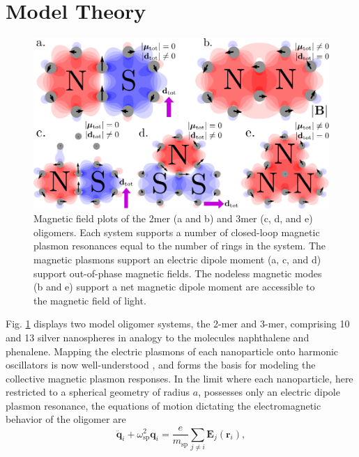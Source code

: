 \documentclass[journal=apchd5,manuscript=article]{achemso}
\begin{document}
\section{Model Theory}
\begin{figure}
\includegraphics{fig1.pdf}
\caption{Magnetic field plots of the 2mer (a and b) and 3mer (c, d, and e) oligomers. Each system supports a number of closed-loop magnetic plasmon resonances equal to the number of rings in the system. The magnetic plasmons support an electric dipole moment (a, c, and d) support out-of-phase magnetic fields. The nodeless magnetic modes (b and e) support a net magnetic dipole moment are accessible to the magnetic field of light.}
\label{field_plots}
\end{figure}
Fig. \ref{field_plots} displays two model oligomer systems, the 2-mer and 3-mer, comprising 10 and 13 silver nanospheres in analogy to the molecules naphthalene and phenalene. Mapping the electric plasmons of each nanoparticle onto harmonic oscillators is now well-understood \cite{Cherqui2014,ARPC}, and forms the basis for modeling the collective magnetic plasmon responses. In the limit where each nanoparticle, here restricted to a spherical geometry of radius $a$, possesses only an electric dipole plasmon resonance, the equations of motion dictating the electromagnetic behavior of the oligomer are
\begin{equation}
\ddot{\textbf{q}}_i +\omega_{\textrm{sp}}^2\textbf{q}_i = \frac{e}{m_{\textrm{sp}}}\sum_{j\neq i}\textbf{E}_j(\textbf{r}_i),
\label{equation_of_motion}
\end{equation}
\end{document}
